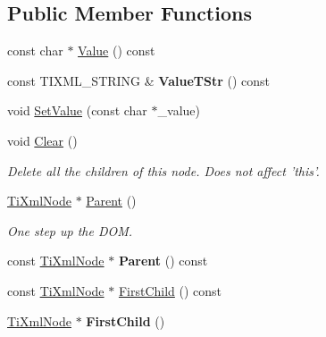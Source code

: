 \subsection*{\-Public \-Member \-Functions}
\begin{DoxyCompactItemize}
\item 
const char $\ast$ \hyperlink{class_ti_xml_node_a77943eb90d12c2892b1337a9f5918b41}{\-Value} () const 
\item 
\hypertarget{class_ti_xml_node_a83ece13d2ea66dac66e0b21332229239}{
const \-T\-I\-X\-M\-L\-\_\-\-S\-T\-R\-I\-N\-G \& {\bfseries \-Value\-T\-Str} () const }
\label{class_ti_xml_node_a83ece13d2ea66dac66e0b21332229239}

\item 
void \hyperlink{class_ti_xml_node_a2a38329ca5d3f28f98ce932b8299ae90}{\-Set\-Value} (const char $\ast$\-\_\-value)
\item 
\hypertarget{class_ti_xml_node_a708e7f953df61d4d2d12f73171550a4b}{
void \hyperlink{class_ti_xml_node_a708e7f953df61d4d2d12f73171550a4b}{\-Clear} ()}
\label{class_ti_xml_node_a708e7f953df61d4d2d12f73171550a4b}

\begin{DoxyCompactList}\small\item\em \-Delete all the children of this node. \-Does not affect 'this'. \end{DoxyCompactList}\item 
\hypertarget{class_ti_xml_node_ab643043132ffd794f8602685d34a982e}{
\hyperlink{class_ti_xml_node}{\-Ti\-Xml\-Node} $\ast$ \hyperlink{class_ti_xml_node_ab643043132ffd794f8602685d34a982e}{\-Parent} ()}
\label{class_ti_xml_node_ab643043132ffd794f8602685d34a982e}

\begin{DoxyCompactList}\small\item\em \-One step up the \-D\-O\-M. \end{DoxyCompactList}\item 
\hypertarget{class_ti_xml_node_a78878709e53066f06eb4fcbcdd3a5260}{
const \hyperlink{class_ti_xml_node}{\-Ti\-Xml\-Node} $\ast$ {\bfseries \-Parent} () const }
\label{class_ti_xml_node_a78878709e53066f06eb4fcbcdd3a5260}

\item 
const \hyperlink{class_ti_xml_node}{\-Ti\-Xml\-Node} $\ast$ \hyperlink{class_ti_xml_node_a44c8eee26bbe2d1b2762038df9dde2f0}{\-First\-Child} () const 
\item 
\hypertarget{class_ti_xml_node_a5e97d69b7c0ebd27fb7286be56559b77}{
\hyperlink{class_ti_xml_node}{\-Ti\-Xml\-Node} $\ast$ {\bfseries \-First\-Child} ()}
\label{class_ti_xml_node_a5e97d69b7c0ebd27fb7286be56559b77}


\end{DoxyCompactItemize}
